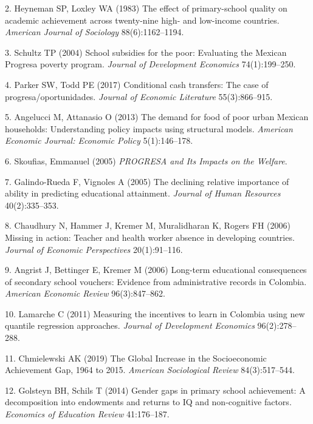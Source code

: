 \documentclass[9pt,twocolumn,twoside,]{pnas-new}
\begin{document}
\leavevmode\hypertarget{ref-Heyneman1983}{}%
2. Heyneman SP, Loxley WA (1983) The effect of primary-school quality on
academic achievement across twenty-nine high- and low-income countries.
\emph{American Journal of Sociology} 88(6):1162--1194.

\leavevmode\hypertarget{ref-Schultz2004}{}%
3. Schultz TP (2004) School subsidies for the poor: Evaluating the
Mexican Progresa poverty program. \emph{Journal of Development
Economics} 74(1):199--250.

\leavevmode\hypertarget{ref-Parker2017}{}%
4. Parker SW, Todd PE (2017) Conditional cash transfers: The case of
progresa/oportunidades. \emph{Journal of Economic Literature}
55(3):866--915.

\leavevmode\hypertarget{ref-Angelucci2013}{}%
5. Angelucci M, Attanasio O (2013) The demand for food of poor urban
Mexican households: Understanding policy impacts using structural
models. \emph{American Economic Journal: Economic Policy} 5(1):146--178.

\leavevmode\hypertarget{ref-Skoufias2005}{}%
6. Skoufias, Emmanuel (2005) \emph{PROGRESA and Its Impacts on the
Welfare}.

\leavevmode\hypertarget{ref-Galindo-Rueda2005}{}%
7. Galindo-Rueda F, Vignoles A (2005) The declining relative importance
of ability in predicting educational attainment. \emph{Journal of Human
Resources} 40(2):335--353.

\leavevmode\hypertarget{ref-Chaudhury2006}{}%
8. Chaudhury N, Hammer J, Kremer M, Muralidharan K, Rogers FH (2006)
Missing in action: Teacher and health worker absence in developing
countries. \emph{Journal of Economic Perspectives} 20(1):91--116.

\leavevmode\hypertarget{ref-Angrist2006}{}%
9. Angrist J, Bettinger E, Kremer M (2006) Long-term educational
consequences of secondary school vouchers: Evidence from administrative
records in Colombia. \emph{American Economic Review} 96(3):847--862.

\leavevmode\hypertarget{ref-Lamarche2011}{}%
10. Lamarche C (2011) Measuring the incentives to learn in Colombia
using new quantile regression approaches. \emph{Journal of Development
Economics} 96(2):278--288.

\leavevmode\hypertarget{ref-Chmielewski2019}{}%
11. Chmielewski AK (2019) The Global Increase in the Socioeconomic
Achievement Gap, 1964 to 2015. \emph{American Sociological Review}
84(3):517--544.

\leavevmode\hypertarget{ref-Golsteyn2014}{}%
12. Golsteyn BH, Schils T (2014) Gender gaps in primary school
achievement: A decomposition into endowments and returns to IQ and
non-cognitive factors. \emph{Economics of Education Review} 41:176--187.
\end{document}
